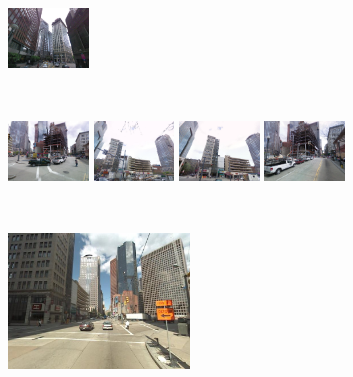 \documentclass[table]{article} %
\begin{document}
\begin{figure}
\begin{minipage}{0.75\linewidth}
\begin{minipage}{\linewidth}
                \colorbox{myGreen}{\includegraphics[height=16mm]{imgs/ex1/FVsvm4}}
            \end{minipage}
            \\
            \begin{minipage}{\linewidth}
                \colorbox{myRed}{\includegraphics[height=16mm]{imgs/ex1/FV1}}
                \colorbox{myRed}{\includegraphics[height=16mm]{imgs/ex1/FV2}}
                \colorbox{myRed}{\includegraphics[height=16mm]{imgs/ex1/FV3}}
                \colorbox{myRed}{\includegraphics[height=16mm]{imgs/ex1/FV4}}
            \end{minipage} 
        \end{minipage}
        \\
        \begin{minipage}{0.34\linewidth}
            \centering
            \vspace{0mm}
            \includegraphics[height=36mm]{imgs/ex2/query}
        \end{minipage}

\end{figure}
\end{document}
